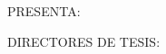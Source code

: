 \begin{titlepage}
\begin{minipage}{.7\textwidth}
{  		\makeatletter
      {\@grado\par}
      \makeatother

  		\large{\textsc{PRESENTA:}}\\[0.3cm]

      \makeatletter
      {\@alumno\par}
      \makeatother

  		\large{DIRECTORES DE TESIS:}\\[0.3cm]

      \makeatletter
		  {\@directores\par}
      \vspace{3cm}
      {\@fecha}
      \makeatother

  	}
  \end{minipage}

  \thispagestyle{empty}
  \vspace*{\fill}

\end{titlepage}
\thispagestyle{empty}
\cleardoublepage
